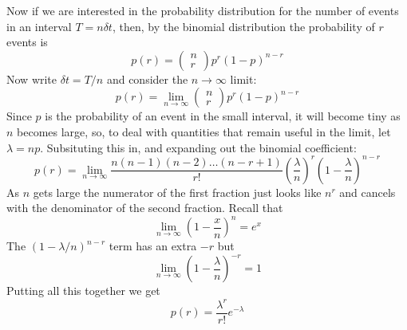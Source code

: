 \documentclass[11pt,a4paper]{scrartcl}
\begin{document}
Now if we are interested in the probability distribution for the
number of events in an interval $T=n\delta t$, then, by the binomial
distribution the probability of $r$ events is
\begin{equation}
p(r)=\left(\begin{array}{c}n\\r\end{array}\right)p^r(1-p)^{n-r}
\end{equation}
Now write $\delta t=T/n$ and consider the $n\rightarrow \infty$ limit:
\begin{equation}
p(r)=\lim_{n\rightarrow\infty}\left(\begin{array}{c}n\\r\end{array}\right)p^r(1-p)^{n-r}
\end{equation}
Since $p$ is the probability of an event in the small interval, it
will become tiny as $n$ becomes large, so, to deal with quantities
that remain useful in the limit, let $\lambda=np$. Subsituting this
in, and expanding out the binomial coefficient:
\begin{equation}
p(r)=\lim_{n\rightarrow\infty}\frac{n(n-1)(n-2)\ldots (n-r+1)}{r!}\left(\frac{\lambda}{n}\right)^r\left(1-\frac{\lambda}{n}\right)^{n-r}
\end{equation}
As $n$ gets large the numerator of the first fraction just looks like $n^r$ and cancels with the denominator of the second fraction. Recall that
\begin{equation}
\lim_{n\rightarrow \infty}\left(1-\frac{x}{n}\right)^n=e^x
\end{equation}
The $(1-\lambda/n)^{n-r}$ term has an extra $-r$ but
\begin{equation}
\lim_{n\rightarrow \infty}\left(1-\frac{\lambda}{n}\right)^{-r}=1
\end{equation}
Putting all this together we get
\begin{equation}
p(r)=\frac{\lambda^r}{r!}e^{-\lambda}
\end{equation}
\end{document}
